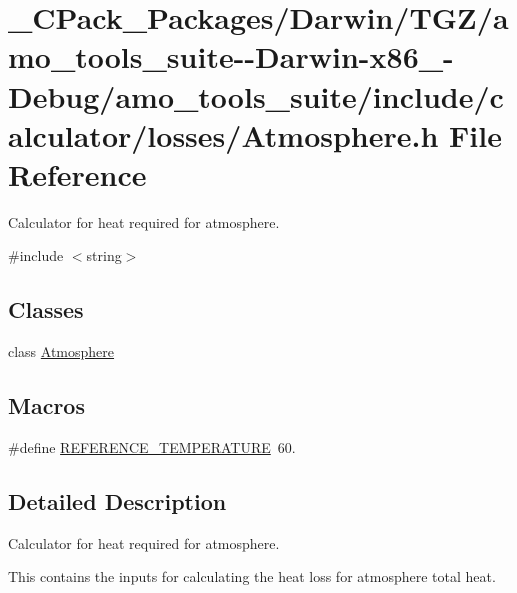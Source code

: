 \hypertarget{___c_pack___packages_2_darwin_2_t_g_z_2amo__tools__suite--_darwin-x86__64-_debug_2amo__tools__su03e4aaac6fa26032bf30885d7e2b6c60}{}\section{\+\_\+\+C\+Pack\+\_\+\+Packages/\+Darwin/\+T\+G\+Z/amo\+\_\+tools\+\_\+suite-\/-\/\+Darwin-\/x86\+\_-\/\+Debug/amo\+\_\+tools\+\_\+suite/include/calculator/losses/\+Atmosphere.h File Reference}
\label{___c_pack___packages_2_darwin_2_t_g_z_2amo__tools__suite--_darwin-x86__64-_debug_2amo__tools__su03e4aaac6fa26032bf30885d7e2b6c60}


Calculator for heat required for atmosphere.  


{\ttfamily \#include $<$string$>$}\newline
\subsection*{Classes}
\begin{DoxyCompactItemize}
\item 
class \hyperlink{class_atmosphere}{Atmosphere}
\end{DoxyCompactItemize}
\subsection*{Macros}
\begin{DoxyCompactItemize}
\item 
\#define \hyperlink{___c_pack___packages_2_darwin_2_t_g_z_2amo__tools__suite--_darwin-x86__64-_debug_2amo__tools__su03e4aaac6fa26032bf30885d7e2b6c60_a4fb3326b931fe94b2ec5f8acfbdd56a8}{R\+E\+F\+E\+R\+E\+N\+C\+E\+\_\+\+T\+E\+M\+P\+E\+R\+A\+T\+U\+RE}~60.
\end{DoxyCompactItemize}


\subsection{Detailed Description}
Calculator for heat required for atmosphere. 

This contains the inputs for calculating the heat loss for atmosphere total heat.

